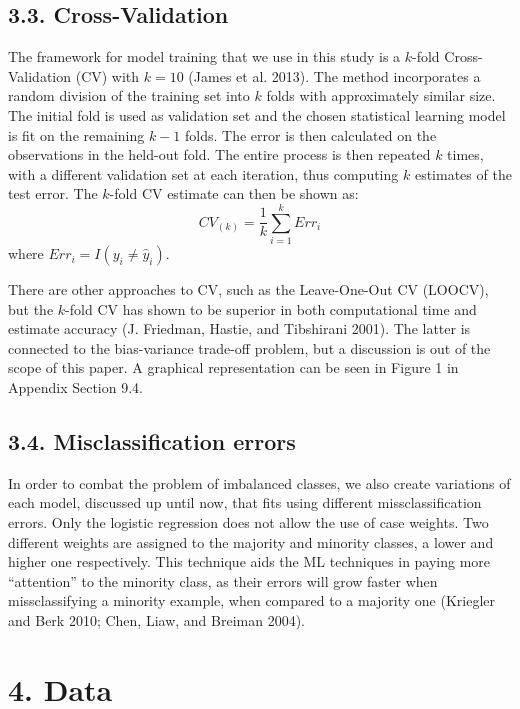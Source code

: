 \documentclass[12pt,]{article}
\begin{document}
\hypertarget{cross-validation}{%
\subsection{3.3. Cross-Validation}\label{cross-validation}}

The framework for model training that we use in this study is a
\(k\)-fold Cross-Validation (CV) with \(k=10\) (James et al. 2013). The
method incorporates a random division of the training set into \(k\)
folds with approximately similar size. The initial fold is used as
validation set and the chosen statistical learning model is fit on the
remaining \(k-1\) folds. The error is then calculated on the
observations in the held-out fold. The entire process is then repeated
\(k\) times, with a different validation set at each iteration, thus
computing \(k\) estimates of the test error. The \(k\)-fold CV estimate
can then be shown as: \[CV_{(k)}=\frac{1}{k}\sum_{i=1}^{k}Err_i\] where
\(Err_i = I(y_i\neq \widehat{y}_i)\).

There are other approaches to CV, such as the Leave-One-Out CV (LOOCV),
but the \(k\)-fold CV has shown to be superior in both computational
time and estimate accuracy (J. Friedman, Hastie, and Tibshirani 2001).
The latter is connected to the bias-variance trade-off problem, but a
discussion is out of the scope of this paper. A graphical representation
can be seen in Figure 1 in Appendix Section 9.4.

\hypertarget{misclassification-errors}{%
\subsection{3.4. Misclassification
errors}\label{misclassification-errors}}

In order to combat the problem of imbalanced classes, we also create
variations of each model, discussed up until now, that fits using
different missclassification errors. Only the logistic regression does
not allow the use of case weights. Two different weights are assigned to
the majority and minority classes, a lower and higher one respectively.
This technique aids the ML techniques in paying more ``attention'' to
the minority class, as their errors will grow faster when
missclassifying a minority example, when compared to a majority one
(Kriegler and Berk 2010; Chen, Liaw, and Breiman 2004).

\hypertarget{data}{%
\section{4. Data}\label{data}}
\end{document}
